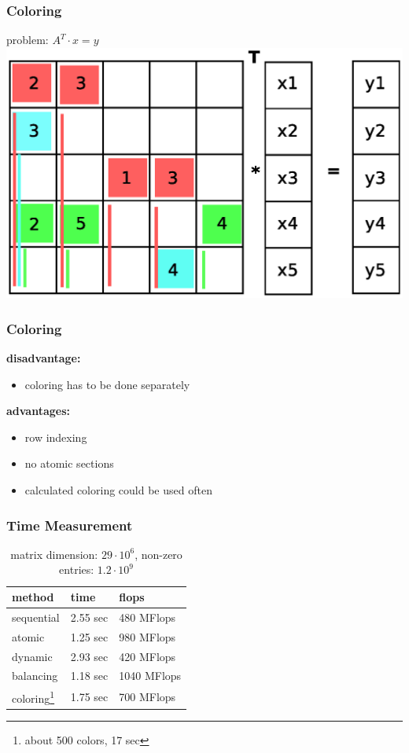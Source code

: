\documentclass{beamer}
\begin{document}
\begin{frame}
\frametitle{Coloring}
problem: $A^T \cdot x= y$
\includegraphics[width=0.8\linewidth]{graphic/coloringT10.eps}
\end{frame}

\begin{frame}
\frametitle{Coloring}
\textbf{disadvantage:}
\begin{itemize}
\item coloring has to be done separately
\end{itemize}

\textbf{advantages:}
\begin{itemize}
\item row indexing
\item no atomic sections
\item calculated coloring could be used often
\end{itemize}
\end{frame}

\begin{frame}
\frametitle{Time Measurement}
\begin{table}
\begin{tabular}{l l l}
\toprule
\textbf{method} & \textbf{time} & \textbf{flops}\\
\midrule
sequential & 2.55 sec & 480 MFlops \\
atomic & 1.25 sec & 980 MFlops \\
dynamic & 2.93 sec & 420 MFlops \\
balancing & 1.18 sec & 1040 MFlops \\
coloring\footnote{about 500 colors, 17 sec} & 1.75 sec & 700 MFlops \\
\bottomrule
\end{tabular}
\caption{matrix dimension: $29\cdot 10^6$, non-zero entries: $1.2\cdot 10^9$}
\end{table}
\end{frame}
\end{document}
